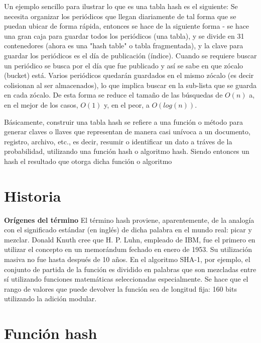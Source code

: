 \documentclass[letterpaper,openright,12pt]{report}
\begin{document}
Un ejemplo sencillo para ilustrar lo que es una tabla hash es el siguiente: Se necesita organizar los periódicos que llegan diariamente de tal forma que se puedan ubicar de forma rápida, entonces se hace de la siguiente forma - se hace una gran caja para guardar todos los periódicos (una tabla), y se divide en 31 contenedores (ahora es una "hash table" o tabla fragmentada), y la clave para guardar los periódicos es el día de publicación (índice). Cuando se requiere buscar un periódico se busca por el día que fue publicado y así se sabe en que zócalo (bucket) está. Varios periódicos quedarán guardados en el mismo zócalo (es decir colisionan al ser almacenados), lo que implica buscar en la sub-lista que se guarda en cada zócalo. De esta forma se reduce el tamaño de las búsquedas de $O(n)$ a, en el mejor de los casos, $O(1)$ y, en el peor, a $O(log(n))$.

Básicamente, construir una tabla hash se refiere a una función o método para generar claves o llaves que representan de manera casi unívoca a un documento, registro, archivo, etc., es decir, resumir o identificar un dato a tráves de la probabilidad, utilizando una función hash o algoritmo hash. Siendo entonces un hash el resultado que otorga dicha función o algoritmo%

\newpage
\section{Historia}

\textbf{Orígenes del término} El término hash proviene, aparentemente,
de la analogía con el significado estándar (en inglés) de dicha palabra
en el mundo real: picar y mezclar. Donald Knuth cree que H. P. Luhn,
empleado de IBM, fue el primero en utilizar el concepto en un memorándum
fechado en enero de 1953. Su utilización masiva no fue hasta después de
10 años. En el algoritmo SHA-1, por ejemplo, el conjunto de partida de
la función es dividido en palabras que son mezcladas entre sí utilizando
funciones matemáticas seleccionadas especialmente. Se hace que el rango
de valores que puede devolver la función sea de longitud fija: 160 bits
utilizando la adición modular.
\newpage



\section{Función hash}
\end{document}
